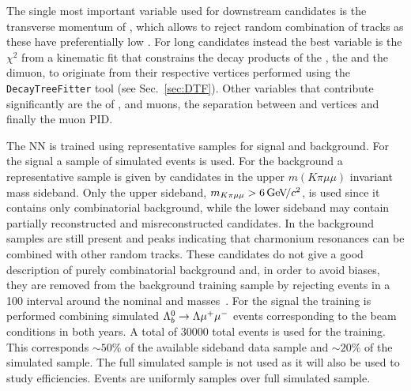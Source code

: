 The single most important variable used for downstream candidates is the transverse momentum of
\Lz, which allows to reject random combination of tracks as these have preferentially low \pt.
For long candidates instead the best variable is the $\chi^2$ from a kinematic fit that constrains
the decay products of the \Lb, the \Lz and the dimuon, to originate from their respective vertices
performed using the \verb!DecayTreeFitter! tool (see Sec.~\ref{sec:DTF}).
Other variables that contribute significantly are the \chisqip of \Lb, \Lz and muons,
the separation between \Lb and \Lz vertices and finally the muon PID.

The NN is trained using representative samples for signal and background. 
For the signal a sample of simulated \Lb\to\Lz\mm events is used. For the background a representative sample
is given by candidates in the upper $m(K\pi\mu\mu)$ invariant mass sideband. Only the upper sideband,
$m_{K\pi\mu\mu} > 6 \gevcc$, is used since it contains only combinatorial background,
while the lower sideband may contain partially reconstructed and misreconstructed candidates.
In the background samples are still present \jpsi and \psitwos peaks indicating that charmonium resonances
can be combined with other random tracks. These candidates do not give a good description of purely
combinatorial background and, in order to avoid biases, they are removed from the background training
sample by rejecting events in a 100 \mevcc  interval around the nominal \jpsi and \psitwos masses~\cite{PDG2014}.
For the signal the training is performed combining simulated ${{\Lambda}^0_{b}}\rightarrow{\ensuremath{\Lambda}}{\ensuremath{\mu^+\mu^-}}$ events corresponding 
to the beam conditions in both years. %
A total of 30000 total events is used for the training. This corresponds $\sim 50\%$ of the available
sideband data sample and $\sim 20\%$ of the simulated sample. The full simulated sample is not used
as it will also be used to study efficiencies. Events are uniformly samples over full simulated sample.

